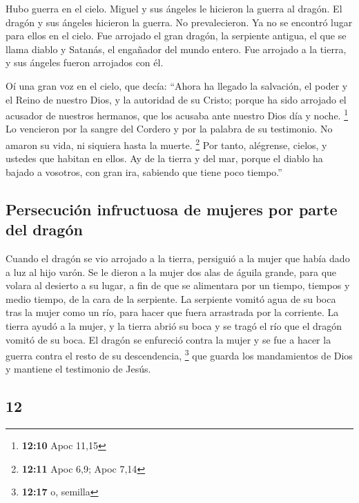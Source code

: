 \begin{paracol}{2}
 Hubo guerra en el cielo. Miguel y sus ángeles le hicieron
la guerra al dragón. El dragón y sus ángeles hicieron la guerra.
 No prevalecieron. Ya no se encontró lugar para ellos en
el cielo.  Fue arrojado el gran dragón, la serpiente
antigua, el que se llama diablo y Satanás, el engañador del mundo
entero. Fue arrojado a la tierra, y sus ángeles fueron arrojados con él.

 Oí una gran voz en el cielo, que decía: ``Ahora ha
llegado la salvación, el poder y el Reino de nuestro Dios, y la
autoridad de su Cristo; porque ha sido arrojado el acusador de nuestros
hermanos, que los acusaba ante nuestro Dios día y noche. \footnote{\textbf{12:10}
  Apoc 11,15}  Lo vencieron por la sangre del Cordero y
por la palabra de su testimonio. No amaron su vida, ni siquiera hasta la
muerte. \footnote{\textbf{12:11} Apoc 6,9; Apoc 7,14} 
Por tanto, alégrense, cielos, y ustedes que habitan en ellos. Ay de la
tierra y del mar, porque el diablo ha bajado a vosotros, con gran ira,
sabiendo que tiene poco tiempo.''

\hypertarget{persecuciuxf3n-infructuosa-de-mujeres-por-parte-del-draguxf3n}{%
\subsection{Persecución infructuosa de mujeres por parte del
dragón}\label{persecuciuxf3n-infructuosa-de-mujeres-por-parte-del-draguxf3n}}

 Cuando el dragón se vio arrojado a la tierra, persiguió
a la mujer que había dado a luz al hijo varón.  Se le
dieron a la mujer dos alas de águila grande, para que volara al desierto
a su lugar, a fin de que se alimentara por un tiempo, tiempos y medio
tiempo, de la cara de la serpiente.  La serpiente vomitó
agua de su boca tras la mujer como un río, para hacer que fuera
arrastrada por la corriente.  La tierra ayudó a la mujer,
y la tierra abrió su boca y se tragó el río que el dragón vomitó de su
boca.  El dragón se enfureció contra la mujer y se fue a
hacer la guerra contra el resto de su descendencia, \footnote{\textbf{12:17}
  o, semilla} que guarda los mandamientos de Dios y mantiene el
testimonio de Jesús.

\switchcolumn
\begin{otherlanguage}{english}

\hypertarget{section-23}{%
\section{12}\label{section-23}}


\end{otherlanguage}
\end{paracol}
